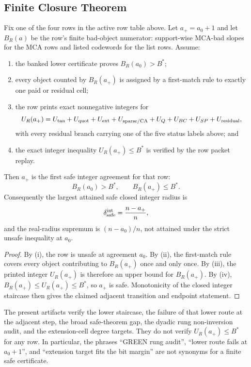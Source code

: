 \subsection{Finite Closure Theorem}

\begin{theorem}
\label{thm:finite-adjacent-closure-audit}
Fix one of the four rows in the active row table above.  Let \(a_+=a_0+1\)
and let \(B_R(a)\) be the row's finite bad-object numerator: support-wise
MCA-bad slopes for the MCA rows and listed codewords for the list rows.  Assume:
\begin{enumerate}[label=\textup{(\roman*)}]
\item the banked lower certificate proves \(B_R(a_0)>B^*\);
\item every object counted by \(B_R(a_+)\) is assigned by a first-match rule to
exactly one paid or residual cell;
\item the row prints exact nonnegative integers for
\[
U_R(a_+)=
U_{\rm tan}+U_{\rm quot}+U_{\rm ext}+U_{\rm sparse/CA}
        +U_Q+U_{BC}+U_{SP}+U_{\rm residual},
\]
with every residual branch carrying one of the five status labels above; and
\item the exact integer inequality \(U_R(a_+)\le B^*\) is verified by the row
packet replay.
\end{enumerate}
Then \(a_+\) is the first safe integer agreement for that row:
\[
        B_R(a_0)>B^*,\qquad B_R(a_+)\le B^*.
\]
Consequently the largest attained safe closed integer radius is
\[
        \delta_{\rm safe}^{\rm int}=\frac{n-a_+}{n},
\]
and the real-radius supremum is \((n-a_0)/n\), not attained under the strict
unsafe inequality at \(a_0\).
\end{theorem}

\begin{proof}
By (i), the row is unsafe at agreement \(a_0\).  By (ii), the first-match rule
covers every object contributing to \(B_R(a_+)\) once and only once.  By (iii),
the printed integer \(U_R(a_+)\) is therefore an upper bound for
\(B_R(a_+)\).  By (iv), \(B_R(a_+)\le U_R(a_+)\le B^*\), so \(a_+\) is safe.
Monotonicity of the closed integer staircase then gives the claimed adjacent
transition and endpoint statement.
\end{proof}

\begin{remark}
The present artifacts verify the lower staircase, the failure of that lower
route at the adjacent step, the broad safe-theorem gap, the dyadic rung
non-inversion audit, and the extension-cell degree targets.  They do not
verify \(U_R(a_+)\le B^*\) for any row.  In particular, the phrases
``GREEN rung audit'', ``lower route fails at \(a_0+1\)'', and
``extension target fits the bit margin'' are not synonyms for a finite safe
certificate.
\end{remark}
